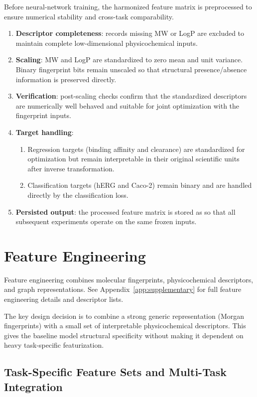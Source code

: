 \documentclass[a4paper,11pt,twoside]{report}
\begin{document}
Before neural-network training, the harmonized feature matrix is preprocessed to ensure numerical stability and cross-task comparability.

\begin{enumerate}
\item \textbf{Descriptor completeness}: records missing MW or LogP are excluded to maintain complete low-dimensional physicochemical inputs.
\item \textbf{Scaling}: MW and LogP are standardized to zero mean and unit variance. Binary fingerprint bits remain unscaled so that structural presence/absence information is preserved directly.
\item \textbf{Verification}: post-scaling checks confirm that the standardized descriptors are numerically well behaved and suitable for joint optimization with the fingerprint inputs.
\item \textbf{Target handling}:
  \begin{enumerate}
  \item Regression targets (binding affinity and clearance) are standardized for optimization but remain interpretable in their original scientific units after inverse transformation.
  \item Classification targets (hERG and Caco-2) remain binary and are handled directly by the classification loss.
  \end{enumerate}
\item \textbf{Persisted output}: the processed feature matrix is stored as  so that all subsequent experiments operate on the same frozen inputs.
\end{enumerate}

\section{Feature Engineering}

Feature engineering combines molecular fingerprints, physicochemical descriptors, and graph representations. See Appendix~\ref{app:supplementary} for full feature engineering details and descriptor lists.

The key design decision is to combine a strong generic representation (Morgan fingerprints) with a small set of interpretable physicochemical descriptors. This gives the baseline model structural specificity without making it dependent on heavy task-specific featurization.

\subsection{Task-Specific Feature Sets and Multi-Task Integration}
\end{document}
